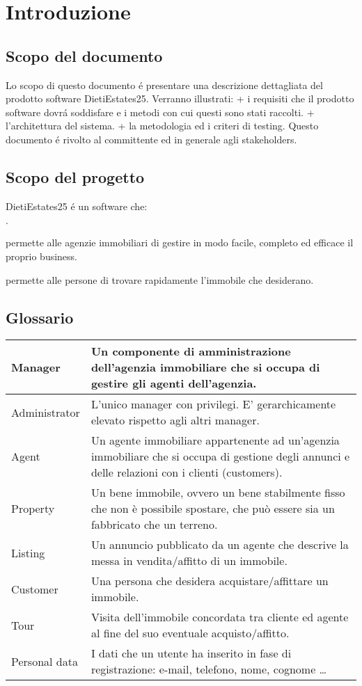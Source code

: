 \chapter{Introduzione}
\section{Scopo del documento}
Lo scopo di questo documento é presentare una descrizione dettagliata del 
prodotto software DietiEstates25. Verranno illustrati: 
+ i requisiti che il prodotto software dovrá soddisfare e i metodi con cui questi sono stati raccolti.
+ l'architettura del sistema.
+ la metodologia ed i criteri di testing.
Questo documento é rivolto al committente ed in generale agli stakeholders. 

\section{Scopo del progetto}
DietiEstates25 é un software che:
\begin{list}{$\cdot$}{}
    \item permette alle agenzie immobiliari di gestire in modo facile,
    completo ed efficace il proprio business.
    \item permette alle persone di trovare rapidamente l'immobile 
    che desiderano.
\end{list}

\section{Glossario}
\begin{center}
\begin{tabular}{| m{8em} | m{8cm}|}
    \hline
    Manager & Un componente di amministrazione dell'agenzia immobiliare 
    che si occupa di gestire gli agenti dell'agenzia. \\
    \hline
    Administrator & L'unico manager con privilegi. E' gerarchicamente 
    elevato rispetto agli altri manager.
    \\
    \hline
    Agent & Un agente immobiliare appartenente ad un'agenzia immobiliare 
    che si occupa di gestione degli annunci e delle relazioni con i clienti (customers). \\
    \hline
    Property & Un bene immobile, ovvero un bene stabilmente fisso che non è 
    possibile spostare, che può essere sia un fabbricato che un terreno.\\
    \hline
    Listing & Un annuncio pubblicato da un agente che descrive la messa in 
    vendita/affitto di un immobile. \\
    \hline
    Customer & Una persona che desidera acquistare/affittare un immobile.\\
    \hline
    Tour & Visita dell'immobile concordata tra cliente ed agente al fine del 
    suo eventuale acquisto/affitto.\\
    \hline
    Personal data & I dati che un utente ha inserito in fase di registrazione: 
    e-mail, telefono, nome, cognome \dots \\
    \hline

\end{tabular}
\end{center}